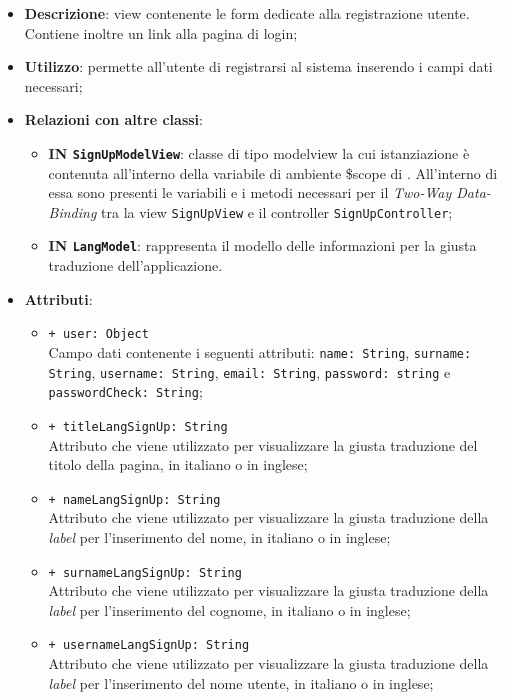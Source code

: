 \begin{itemize}
	\item \textbf{Descrizione}: view contenente le form dedicate alla registrazione utente. Contiene inoltre un link alla pagina di login;
	\item \textbf{Utilizzo}: permette all'utente di registrarsi al sistema inserendo i campi dati necessari;
	\item \textbf{Relazioni con altre classi}:
	\begin{itemize}
		\item \textbf{IN \texttt{SignUpModelView}}: classe di tipo modelview la cui istanziazione è contenuta all'interno della variabile di ambiente \$scope di . All'interno di essa sono presenti le variabili e i metodi necessari per il \textit{Two-Way Data-Binding} tra la view \texttt{SignUpView} e il controller \texttt{SignUpController};
		\item \textbf{IN \texttt{LangModel}}: rappresenta il modello delle informazioni per la giusta traduzione dell'applicazione.
	\end{itemize}
	\item \textbf{Attributi}:
	\begin{itemize}
		\item \texttt{+ user: Object} \\ Campo dati contenente i seguenti attributi: \texttt{name: String}, \texttt{surname: String}, \texttt{username: String}, \texttt{email: String}, \texttt{password: string} e \texttt{passwordCheck: String};
		\item \texttt{+ titleLangSignUp: String} \\ Attributo che viene utilizzato per visualizzare la giusta traduzione del titolo della pagina, in italiano o in inglese;
		\item \texttt{+ nameLangSignUp: String} \\ Attributo che viene utilizzato per visualizzare la giusta traduzione della \textit{label} per l'inserimento del nome, in italiano o in inglese;
		\item \texttt{+ surnameLangSignUp: String} \\ Attributo che viene utilizzato per visualizzare la giusta traduzione della \textit{label} per l'inserimento del cognome, in italiano o in inglese;
		\item \texttt{+ usernameLangSignUp: String} \\ Attributo che viene utilizzato per visualizzare la giusta traduzione della \textit{label} per l'inserimento del nome utente, in italiano o in inglese;

\end{itemize}
\end{itemize}
